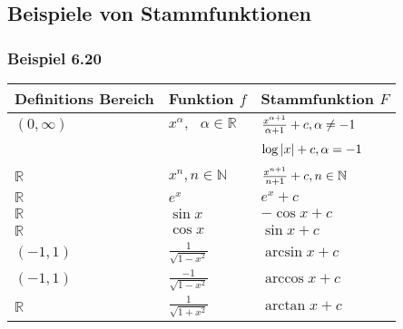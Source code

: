 \subsection*{Beispiele von Stammfunktionen}


\subsubsection*{Beispiel 6.20}
\renewcommand{\arraystretch}{1.6}
\begin{tabularx}{\textwidth}{|Y|Y|Y|}
\hline
    Definitions Bereich & Funktion $f$                          & Stammfunktion $F$                                                      \\\hline\hline
    $(0,\infty)$        & $x^\alpha,\text{ }\alpha\in\mathbb{R}$ & $\frac{{{x^{\alpha  + 1}}}}{{\alpha  + 1}} + c,{\rm{ }}\alpha  \ne  - 1$ \\ [1.5ex]
    ~                   & ~                                     & $\log \left| x \right| + c,{\rm{ }}\alpha  =  - 1$                       \\[1.5ex]\hline
    $\mathbb{R}$        & $x^n, n\in\mathbb{N}$                 & $\frac{{{x^{n + 1}}}}{{n + 1}} + c,{\rm{ }}n \in \mathbb{N}$             \\[1.5ex]\hline
    $\mathbb{R}$        & ${e^x}$                             & ${e^x}+c$                                                                \\ [1.5ex]\hline
    $\mathbb{R}$        & $\sin{x}$                             & $-\cos{x}+c$                                                                \\ [1.5ex]\hline
$\mathbb{R}$        & $\cos{x}$                             & $\sin{x}+c$                                                                \\ [1.5ex]\hline
$(-1,1)$        & $\frac{1}{\sqrt{1-x^2}}$                             & $\arcsin{x}+c$                                                                \\ [1.5ex]\hline
$(-1,1)$        & $\frac{-1}{\sqrt{1-x^2}}$                             & $\arccos{x}+c$                                                                \\ [1.5ex]\hline
$\mathbb{R}$        & $\frac{1}{\sqrt{1+x^2}}$                             & $\arctan{x}+c$                                                                \\ [1.5ex]\hline

\end{tabularx}
